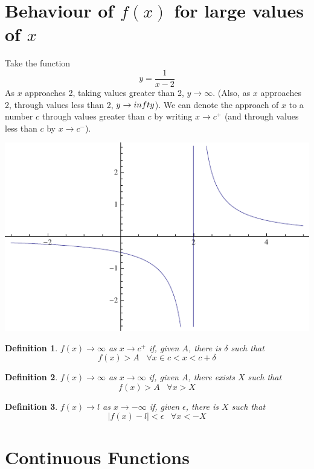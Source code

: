 \documentclass[12pt]{scrbook}
\newtheorem*{definition}{Definition}
\begin{document}
\section{Behaviour of $f(x)$ for large values of $x$}

Take the function
\[ y = \frac{1}{x-2} \]
As $x$ approaches 2, taking values greater than 2, $y \rightarrow \infty$.  (Also, as $x$ approaches 2, through values less
than 2, $y \rightarrow \-infty$).  We can denote the approach of $x$ to a number $c$ through values greater than $c$ by
writing $x \rightarrow c^+$ (and through values less than $c$ by $x \rightarrow c^-$).

\includegraphics{func-1.pdf}

\begin{definition}
$f(x) \rightarrow \infty$ as $x \rightarrow c^+$ if, given $A$, there is $\delta$ such that 
\[ f(x) > A \;\;\; \forall x \in c < x < c + \delta \]
\end{definition}

\begin{definition}
$f(x) \rightarrow \infty$ as $x \rightarrow \infty$ if, given $A$, there exists $X$ such that
\[ f(x) > A \;\;\; \forall x > X \]
\end{definition}

\begin{definition}
$f(x) \rightarrow l$ as $x \rightarrow -\infty$ if, given $\epsilon$, there is $X$ such that 
\[ | f(x) - l | < \epsilon \;\;\; \forall x < -X \]
\end{definition}

\section{Continuous Functions}
\end{document}
